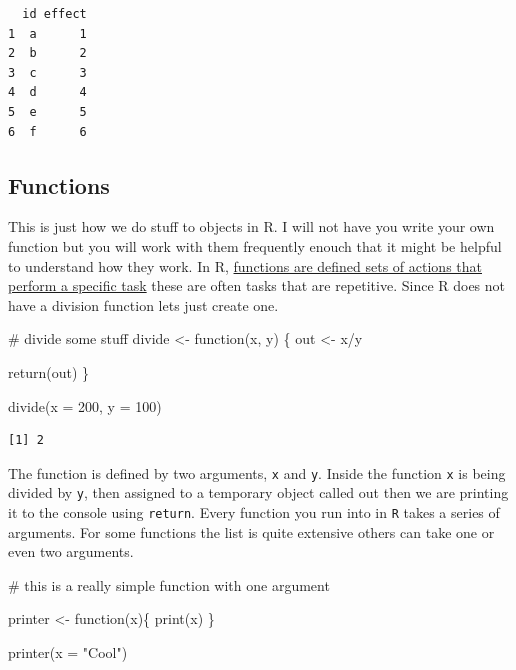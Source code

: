 \documentclass[
  letterpaper,
  DIV=11,
  numbers=noendperiod,
  oneside]{scrreprt}
\newenvironment{Shaded}{\begin{snugshade}}{\end{snugshade}}
\newcommand{\AttributeTok}[1]{\textcolor[rgb]{0.40,0.45,0.13}{#1}}
\newcommand{\CommentTok}[1]{\textcolor[rgb]{0.37,0.37,0.37}{#1}}
\newcommand{\ControlFlowTok}[1]{\textcolor[rgb]{0.00,0.23,0.31}{#1}}
\newcommand{\DecValTok}[1]{\textcolor[rgb]{0.68,0.00,0.00}{#1}}
\newcommand{\FunctionTok}[1]{\textcolor[rgb]{0.28,0.35,0.67}{#1}}
\newcommand{\NormalTok}[1]{\textcolor[rgb]{0.00,0.23,0.31}{#1}}
\newcommand{\OtherTok}[1]{\textcolor[rgb]{0.00,0.23,0.31}{#1}}
\newcommand{\SpecialCharTok}[1]{\textcolor[rgb]{0.37,0.37,0.37}{#1}}
\newcommand{\StringTok}[1]{\textcolor[rgb]{0.13,0.47,0.30}{#1}}
\begin{document}
\begin{verbatim}
  id effect
1  a      1
2  b      2
3  c      3
4  d      4
5  e      5
6  f      6
\end{verbatim}

\hypertarget{functions}{%
\subsection{Functions}\label{functions}}

This is just how we do stuff to objects in R. I will not have you write
your own function but you will work with them frequently enouch that it
might be helpful to understand how they work. In R,
\href{https://r4ds.had.co.nz/functions.html}{functions are defined sets
of actions that perform a specific task} these are often tasks that are
repetitive. Since R does not have a division function lets just create
one.

\begin{Shaded}
\begin{Highlighting}[]
\CommentTok{\# divide some stuff}
\NormalTok{divide }\OtherTok{\textless{}{-}} \ControlFlowTok{function}\NormalTok{(x, y) \{}
\NormalTok{ out }\OtherTok{\textless{}{-}}\NormalTok{ x}\SpecialCharTok{/}\NormalTok{y}

\FunctionTok{return}\NormalTok{(out)}
\NormalTok{\}}

\FunctionTok{divide}\NormalTok{(}\AttributeTok{x =} \DecValTok{200}\NormalTok{, }\AttributeTok{y =} \DecValTok{100}\NormalTok{)}
\end{Highlighting}
\end{Shaded}

\begin{verbatim}
[1] 2
\end{verbatim}

The function is defined by two arguments, \texttt{x} and \texttt{y}.
Inside the function \texttt{x} is being divided by \texttt{y}, then
assigned to a temporary object called out then we are printing it to the
console using \texttt{return}. Every function you run into in \texttt{R}
takes a series of arguments. For some functions the list is quite
extensive others can take one or even two arguments.

\begin{Shaded}
\begin{Highlighting}[]
\CommentTok{\# this is a really simple function with one argument}

\NormalTok{printer }\OtherTok{\textless{}{-}} \ControlFlowTok{function}\NormalTok{(x)\{}
  \FunctionTok{print}\NormalTok{(x)}
\NormalTok{\}}

\FunctionTok{printer}\NormalTok{(}\AttributeTok{x =} \StringTok{"Cool"}\NormalTok{)}
\end{Highlighting}
\end{Shaded}
\end{document}
